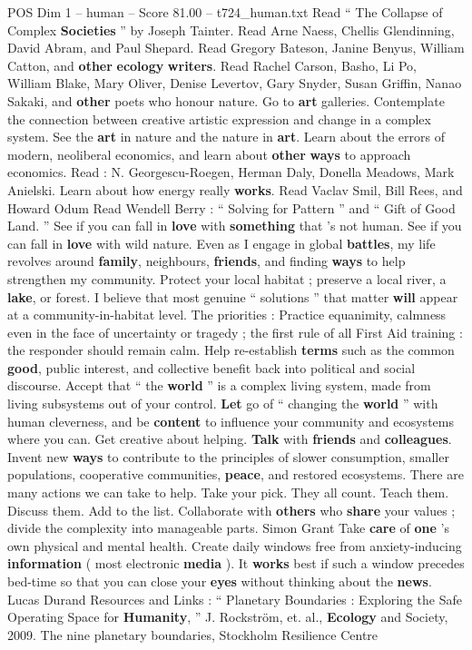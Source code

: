 \begin{textsample}{POS Dim 1 – human – Score 81.00 – t724\_human.txt}
Read “ The Collapse of Complex \textbf{Societies} ” by Joseph Tainter.
Read Arne Naess, Chellis Glendinning, David Abram, and Paul Shepard.
Read Gregory Bateson, Janine Benyus, William Catton, and \textbf{other} \textbf{ecology} \textbf{writers}.
Read Rachel Carson, Basho, Li Po, William Blake, Mary Oliver, Denise Levertov, Gary Snyder, Susan Griffin, Nanao Sakaki, and \textbf{other} poets who honour nature.
Go to \textbf{art} galleries.
Contemplate the connection between creative artistic expression and change in a complex system.
See the \textbf{art} in nature and the nature in \textbf{art}.
Learn about the errors of modern, neoliberal economics, and learn about \textbf{other} \textbf{ways} to approach economics.
Read : N.
Georgescu-Roegen, Herman Daly, Donella Meadows, Mark Anielski.
Learn about how energy really \textbf{works}.
Read Vaclav Smil, Bill Rees, and Howard Odum Read Wendell Berry : “ Solving for Pattern ” and “ Gift of Good Land. ” See if you can fall in \textbf{love} with \textbf{something} that ’s not human.
See if you can fall in \textbf{love} with wild nature.
Even as I engage in global \textbf{battles}, my life revolves around \textbf{family}, neighbours, \textbf{friends}, and finding \textbf{ways} to help strengthen my community.
Protect your local habitat ; preserve a local river, a \textbf{lake}, or forest.
I believe that most genuine “ solutions ” that matter \textbf{will} appear at a community-in-habitat level.
The priorities : Practice equanimity, calmness even in the face of uncertainty or tragedy ; the first rule of all First Aid training : the responder should remain calm.
Help re-establish \textbf{terms} such as the common \textbf{good}, public interest, and collective benefit back into political and social discourse.
Accept that “ the \textbf{world} ” is a complex living system, made from living subsystems out of your control. \textbf{Let} go of “ changing the \textbf{world} ” with human cleverness, and be \textbf{content} to influence your community and ecosystems where you can.
Get creative about helping. \textbf{Talk} with \textbf{friends} and \textbf{colleagues}.
Invent new \textbf{ways} to contribute to the principles of slower consumption, smaller populations, cooperative communities, \textbf{peace}, and restored ecosystems.
There are many actions we can take to help.
Take your pick.
They all count.
Teach them.
Discuss them.
Add to the list.
Collaborate with \textbf{others} who \textbf{share} your values ; divide the complexity into manageable parts.
Simon Grant Take \textbf{care} of \textbf{one} ’s own physical and mental health.
Create daily windows free from anxiety-inducing \textbf{information} ( most electronic \textbf{media} ).
It \textbf{works} best if such a window precedes bed-time so that you can close your \textbf{eyes} without thinking about the \textbf{news}.
Lucas Durand Resources and Links : “ Planetary Boundaries : Exploring the Safe Operating Space for \textbf{Humanity}, ” J.
Rockström, et. al., \textbf{Ecology} and Society, 2009.
The nine planetary boundaries, Stockholm Resilience Centre


\end{textsample}
